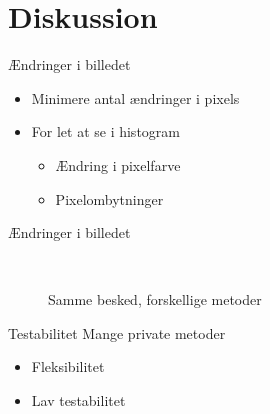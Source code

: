 \section{Diskussion} 
\begin{frame}{Ændringer i billedet}

	\begin{itemize}
		\setlength\itemsep{1em}
		\item Minimere antal ændringer i pixels
		\item For let at se i histogram
		\begin{itemize}
			\vspace*{1em}
			\setlength\itemsep{1em}
			\item<con@1->[$\times$] Ændring i pixelfarve
			\item<pro@1->[\checkmark] Pixelombytninger
		\end{itemize}
	\end{itemize}
\end{frame}

\begin{frame}{Ændringer i billedet}
	\begin{figure}
		\centering
		\begin{center}
		\end{center}
		~
		~
		\caption{Samme besked, forskellige metoder}
	\end{figure}
\end{frame}

\begin{frame}[fragile]{Testabilitet}
	Mange private metoder
	\begin{itemize}
		\item Fleksibilitet %
		\item Lav testabilitet
	\end{itemize}
	\begin{itemize}
	\end{itemize}
\end{frame}

